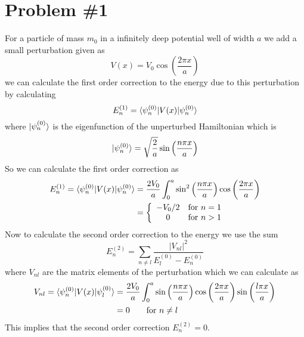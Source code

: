 \documentclass[11pt]{article}
\numberwithin{equation}{section}
\begin{document}


\section{Problem \#1}
For a particle of mass $m_0$ in a infinitely deep potential well of width $a$ we add a small 
perturbation given as
$$V(x) = V_0\cos\left(\frac{2\pi{x}}{a}\right)$$
we can calculate the first order correction to the energy due to this perturbation by 
calculating
$$E_n^{(1)} = \langle{\psi_n^{(0)}}|V(x)|{\psi_n^{(0)}}\rangle$$
where $|{\psi_n^{(0)}}\rangle$ is the eigenfunction of the unperturbed Hamiltonian which is
$$|{\psi_n^{(0)}}\rangle = \sqrt{\frac{2}{a}}\sin\left(\frac{n\pi{x}}{a}\right)$$
So we can calculate the first order correction as
\begin{align*}
E_n^{(1)} = \langle{\psi_n^{(0)}}|V(x)|{\psi_n^{(0)}}\rangle &= \frac{2V_0}{a}\int_{0}^{a}\sin^2\left(\frac{n\pi{x}}{a}\right)\cos\left(\frac{2\pi{x}}{a}\right)\\
&= \left\{\begin{array}{cl}
-V_0/2           &\textnormal{for}\ n=1\\
0                &\textnormal{for}\ n>1
        \end{array}\right.
\end{align*}
Now to calculate the second order correction to the energy we use the sum
$$E_{n}^{(2)} = \sum_{n\ne{l}}\frac{|V_{nl}|^2}{E_{l}^{(0)}-E_{n}^{(0)}}$$
where $V_{nl}$ are the matrix elements of the perturbation which we can calculate as
\begin{align*}
V_{nl} = \langle{\psi_n^{(0)}}|V(x)|{\psi_l^{(0)}}\rangle &= \frac{2V_0}{a}\int_{0}^{a}\sin\left(\frac{n\pi{x}}{a}\right)\cos\left(\frac{2\pi{x}}{a}\right)\sin\left(\frac{l\pi{x}}{a}\right)\\
&= 0\qquad \textnormal{for}\ n\ne{l}
\end{align*}
This implies that the second order correction $E_n^{(2)}=0$.

\pagebreak
\end{document}
